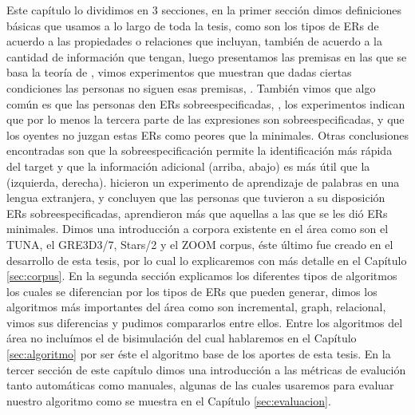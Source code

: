 Este cap\'itulo lo dividimos en 3 secciones, en la primer secci\'on dimos definiciones b\'asicas que usamos a lo largo de toda la tesis, 
como son los tipos de ERs de acuerdo a las propiedades o relaciones que incluyan, tambi\'en de acuerdo a la cantidad de informaci\'on que 
tengan, luego presentamos las premisas en las que se basa la teor\'ia de \cite{clark1992arenas,Clark-Marshall81}, vimos experimentos que muestran que dadas ciertas condiciones las personas no siguen esas premisas, 
\cite{keysar:Curr98}. Tambi\'en vimos que algo com\'un es que las personas den ERs sobreespecificadas, \cite{arts,do-speakers}, los experimentos 
indican que por lo menos la tercera parte de las expresiones son sobreespecificadas, y que los oyentes no juzgan estas ERs como peores que 
la minimales. Otras conclusiones encontradas son que la sobreespecificaci\'on permite la identificaci\'on m\'as r\'apida del target y que la 
informaci\'on adicional (arriba, abajo) es m\'as \'util que la (izquierda, derecha). \cite{Lu_sasha2015} hicieron un experimento de 
aprendizaje de palabras en una lengua extranjera, y concluyen que las personas que tuvieron a su disposici\'on ERs sobreespecificadas, 
aprendieron m\'as que aquellas a las que se les di\'o ERs minimales. Dimos una introducci\'on a corpora existente en el \'area 
como son el TUNA, el GRE3D3/7, Stars/2 y el ZOOM corpus, \'este \'ultimo fue creado en el desarrollo de esta tesis, por lo cual lo explicaremos con m\'as detalle en el Cap\'itulo \ref{sec:corpus}. En la segunda secci\'on explicamos los diferentes tipos de algoritmos los cuales se 
diferencian por los tipos de ERs que pueden generar, dimos los algoritmos m\'as importantes del \'area como son incremental, graph, relacional, vimos sus diferencias y pudimos compararlos entre ellos. Entre los algoritmos del \'area no inclu\'imos el de 
bisimulaci\'on del cual hablaremos en el Cap\'itulo \ref{sec:algoritmo} por ser \'este el algoritmo base de los aportes de esta tesis. En la tercer secci\'on de este cap\'itulo dimos una introducci\'on a las m\'etricas de evaluci\'on tanto autom\'aticas como manuales, algunas de las cuales usaremos para evaluar nuestro algoritmo como se muestra en el Cap\'itulo \ref{sec:evaluacion}.


